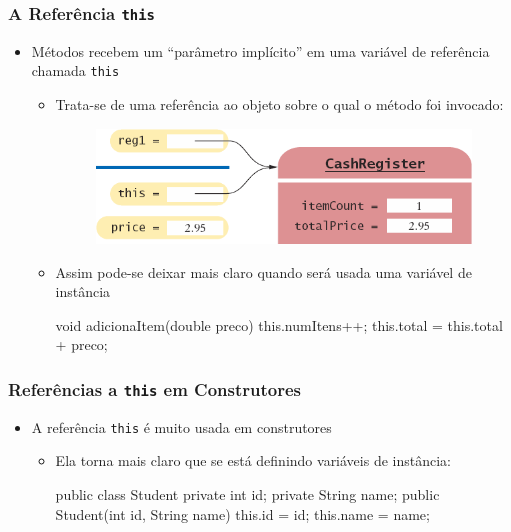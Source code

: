 \documentclass[xcolor={dvipsnames,table},aspectratio=169]{beamer}
\begin{document}
\begin{frame}[fragile]\frametitle{A Referência \texttt{this}}
\begin{itemize}
	\item Métodos recebem um ``parâmetro implícito'' em uma variável de referência chamada \texttt{this}
	\begin{itemize}
		\item Trata-se de uma referência ao objeto sobre o qual o método foi invocado:
\begin{figure}[h]
	\includegraphics[height=0.2\paperheight,center]{pucrs-ep-fprog-unidade_07-objetos_e_classes-laminas-this.png}
\end{figure}
		\item Assim pode-se deixar mais claro quando será usada uma variável de instância
\begin{javacode}
void adicionaItem(double preco) {
  this.numItens++;
  this.total = this.total + preco;
}
\end{javacode}
	\end{itemize}
\end{itemize}
\end{frame}

\begin{frame}[fragile]\frametitle{Referências a \texttt{this} em Construtores}
\begin{itemize}
	\item A referência \texttt{this} é muito usada em construtores
	\begin{itemize}
		\item Ela torna mais claro que se está definindo variáveis de instância:
\begin{javacode}
public class Student {
  private int id;
  private String name;
  public Student(int id, String name) {
    this.id = id;
    this.name = name;
  }
}
\end{javacode}
	\end{itemize}
\end{itemize}
\end{frame}
\end{document}
